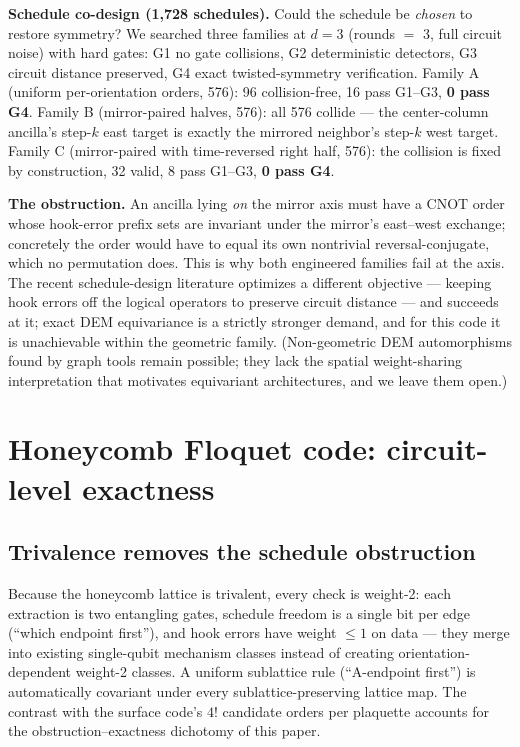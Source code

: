 \documentclass[11pt]{article}
\begin{document}
\textbf{Schedule co-design (1{,}728 schedules).} Could the schedule be
\emph{chosen} to restore symmetry? We searched three families at $d = 3$
(rounds $=$ 3, full circuit noise) with hard gates: G1 no gate collisions,
G2 deterministic detectors, G3 circuit distance preserved, G4 exact
twisted-symmetry verification. Family A (uniform per-orientation orders,
576): 96 collision-free, 16 pass G1--G3, \textbf{0 pass G4}. Family B
(mirror-paired halves, 576): all 576 collide --- the center-column
ancilla's step-$k$ east target is exactly the mirrored neighbor's step-$k$
west target. Family C (mirror-paired with time-reversed right half, 576):
the collision is fixed by construction, 32 valid, 8 pass G1--G3, \textbf{0
pass G4}.

\textbf{The obstruction.} An ancilla lying \emph{on} the mirror axis must
have a CNOT order whose hook-error prefix sets are invariant under the
mirror's east--west exchange; concretely the order would have to equal its
own nontrivial reversal-conjugate, which no permutation does. This is why
both engineered families fail at the axis. The recent schedule-design
literature optimizes a different objective --- keeping hook errors off the
logical operators to preserve circuit distance \cite{Kishony26,Fujiu25} ---
and succeeds at it; exact DEM equivariance is a strictly stronger demand,
and for this code it is unachievable within the geometric family.
(Non-geometric DEM automorphisms found by graph tools \cite{Koutsioumpas25}
remain possible; they lack the spatial weight-sharing interpretation that
motivates equivariant architectures, and we leave them open.)

\section{Honeycomb Floquet code: circuit-level exactness}

\subsection{Trivalence removes the schedule obstruction}

Because the honeycomb lattice is trivalent, every check is weight-2: each
extraction is two entangling gates, schedule freedom is a single bit per
edge (``which endpoint first''), and hook errors have weight $\leq 1$ on
data --- they merge into existing single-qubit mechanism classes instead of
creating orientation-dependent weight-2 classes. A uniform sublattice rule
(``A-endpoint first'') is automatically covariant under every
sublattice-preserving lattice map. The contrast with the surface code's $4!$
candidate orders per plaquette accounts for the obstruction--exactness
dichotomy of this paper.
\end{document}
